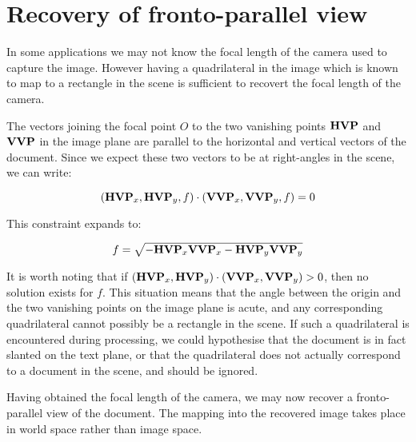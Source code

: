 \section{Recovery of fronto-parallel view}


In some applications we may not know the focal length of the camera used to capture the image.  However having a quadrilateral in the image which is known to map to a rectangle in the scene is sufficient to recovert the focal length of the camera.

The vectors joining the focal point $O$ to the two vanishing points ${ \bf HVP }$ and ${ \bf VVP }$ in the image plane are parallel to the horizontal and vertical vectors of the document.  Since we expect these two vectors to be at right-angles in the scene, we can write:

\begin{equation}
( { \bf HVP }_x , { \bf HVP }_y , f ) \cdot ( { \bf VVP }_x , { \bf VVP }_y , f ) = 0
\end{equation}

This constraint expands to:

\begin{equation}
f = \sqrt{ - { \bf HVP }_x { \bf VVP }_x - { \bf HVP }_y { \bf VVP }_y }
\end{equation}


It is worth noting that if $ ( { \bf HVP }_x , { \bf HVP }_y ) \cdot ( { \bf VVP }_x , { \bf VVP }_y ) > 0 $, then no solution exists for $f$.  This situation means that the angle between the origin and the two vanishing points on the image plane is acute, and any corresponding quadrilateral cannot possibly be a rectangle in the scene.  If such a quadrilateral is encountered during processing, we could hypothesise that the document is in fact slanted on the text plane, or that the quadrilateral does not actually correspond to a document in the scene, and should be ignored.

Having obtained the focal length of the camera, we may now recover a fronto-parallel view of the document.  The mapping into the recovered image takes place in world space rather than image space.

